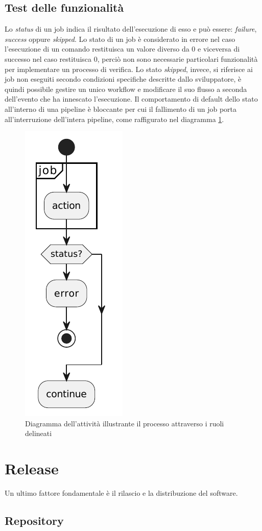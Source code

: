 \subsection{Test delle funzionalità}
Lo \textit{status} di un job indica il risultato dell'esecuzione di esso e può essere: \textit{failure}, \textit{success} oppure \textit{skipped}. Lo stato di un job è considerato in errore nel caso l'esecuzione di un comando restituisca un valore diverso da 0 e viceversa di successo nel caso restituisca 0, perciò non sono necessarie particolari funzionalità per implementare un processo di verifica. Lo stato \textit{skipped}, invece, si riferisce ai job non eseguiti secondo condizioni specifiche descritte dallo sviluppatore, è quindi possibile gestire un unico workflow e modificare il suo flusso a seconda dell'evento che ha innescato l'esecuzione. Il comportamento di default dello stato all'interno di una pipeline è bloccante per cui il fallimento di un job porta all'interruzione dell'intera pipeline, come raffigurato nel diagramma \ref{fig:activity-diagram-job}.

\begin{figure}[htb]
	\centering
	\includegraphics[width=.18\linewidth]{figures/activity-diagram-job.pdf}
	\caption{Diagramma dell'attività illustrante il processo attraverso i ruoli delineati}
	\label{fig:activity-diagram-job}
\end{figure}

\section{Release}

Un ultimo fattore fondamentale è il rilascio e la distribuzione del software. 

\subsection{Repository}


